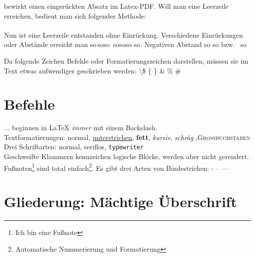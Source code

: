 bewirkt einen eingerückten Absatz im Latex-PDF.
Will man eine Leerzeile erreichen, bedient man sich folgender Methode:\\
\\
Nun ist eine Leerzeile entstanden ohne Einrückung.
Verschiedene Einrückungen oder Abstände erreicht man so\,so\;so\ so\quad so\qquad so \hspace{2.0cm}so. Negativen Abstand s\!o s\!\!o bzw. \ s\!\!\!\!\!o \par
Da folgende Zeichen Befehle oder Formatierungszeichen darstellen, müssen sie im Text etwas aufwendiger geschrieben werden: \textbackslash  \$ \{ \} \& \% \#


\section{Befehle}
... beginnen in \LaTeX{} \emph{immer} mit einem Backslash. \\		%
Textformatierungen: normal, \underline{unterstrichen}, \textbf{fett}, \textit{kursiv}, \textsl{schräg} ,\textsc{Großbuchstaben} \\
Drei Schriftarten: \textnormal{normal}, \textsf{seriflos}, \texttt{typewriter}\\	
{Geschweifte \sffamily Klammern { } kennzeichen {\ttfamily logische Blöcke}, werden aber nicht gerendert.} \\[5pt]  					%
Fußnoten\footnote{Ich bin eine Fußnote} sind total einfach\footnote{Automatische Nummerierung und Formatierung}.
Es gibt drei Arten von Bindestrichen: - -- ---
	


\section{Gliederung: Mächtige Überschrift}

